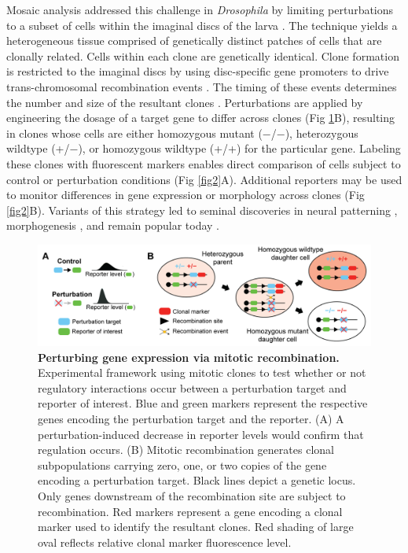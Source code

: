 \documentclass[10pt,letterpaper]{article}
\begin{document}
Mosaic analysis addressed this challenge in \textit{Drosophila} by limiting perturbations to a subset of cells within the imaginal discs of the larva \cite{Xu1993,Xu2012}. The technique yields a heterogeneous tissue comprised of genetically distinct patches of cells that are clonally related. Cells within each clone are genetically identical. Clone formation is restricted to the imaginal discs by using disc-specific gene promoters to drive trans-chromosomal recombination events \cite{Newsome2000,Theodosiou1998}. The timing of these events determines the number and size of the resultant clones \cite{Struhl1993}. Perturbations are applied by engineering the dosage of a target gene to differ across clones (Fig \ref{fig1}B), resulting in clones whose cells are either homozygous mutant ($-$/$-$), heterozygous wildtype (+/$-$), or homozygous wildtype (+/+) for the particular gene. Labeling these clones with fluorescent markers enables direct comparison of cells subject to control or perturbation conditions (Fig \ref{fig2}A). Additional reporters may be used to monitor differences in gene expression or morphology across clones (Fig \ref{fig2}B). Variants of this strategy led to seminal discoveries in neural patterning \cite{Halfar2001,Tomlinson2001,Yang2001}, morphogenesis \cite{Huang2005,Thompson2006}, and remain popular today \cite{Atkins2019,Enomoto2018,Germani2018}.

\begin{figure}[!h]
\centering
\includegraphics[width=0.95\columnwidth]{./figure_1}
\caption{\textbf{Perturbing gene expression via mitotic recombination.}
Experimental framework using mitotic clones to test whether or not regulatory interactions occur between a perturbation target and reporter of interest. Blue and green markers represent the respective genes encoding the perturbation target and the reporter. (A) A perturbation-induced decrease in reporter levels would confirm that regulation occurs. (B) Mitotic recombination generates clonal subpopulations carrying zero, one, or two copies of the gene encoding a perturbation target. Black lines depict a genetic locus. Only genes downstream of the recombination site are subject to recombination. Red markers represent a gene encoding a clonal marker used to identify the resultant clones. Red shading of large oval reflects relative clonal marker fluorescence level.}
\label{fig1}
\end{figure}
\end{document}
